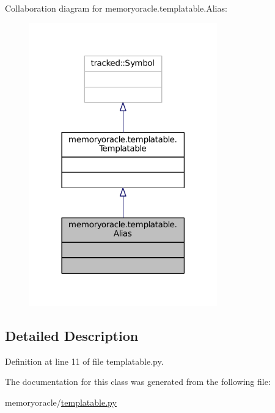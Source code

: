 Collaboration diagram for memoryoracle.\+templatable.\+Alias\+:\nopagebreak
\begin{figure}[H]
\begin{center}
\leavevmode
\includegraphics[width=230pt]{classmemoryoracle_1_1templatable_1_1Alias__coll__graph}
\end{center}
\end{figure}


\subsection{Detailed Description}


Definition at line 11 of file templatable.\+py.



The documentation for this class was generated from the following file\+:\begin{DoxyCompactItemize}
\item 
memoryoracle/\hyperlink{templatable_8py}{templatable.\+py}\end{DoxyCompactItemize}
